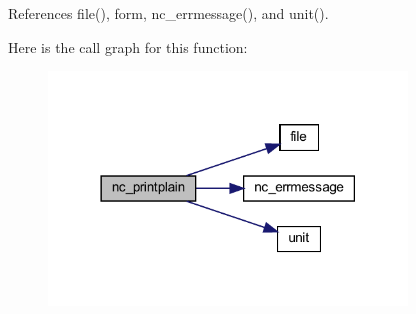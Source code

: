 References file(), form, nc\+\_\+errmessage(), and unit().

Here is the call graph for this function\+:
\nopagebreak
\begin{figure}[H]
\begin{center}
\leavevmode
\includegraphics[width=270pt]{nc__printplain_8f90_aba4329f91d99b9519c4f1da36ca2962f_cgraph}
\end{center}
\end{figure}

